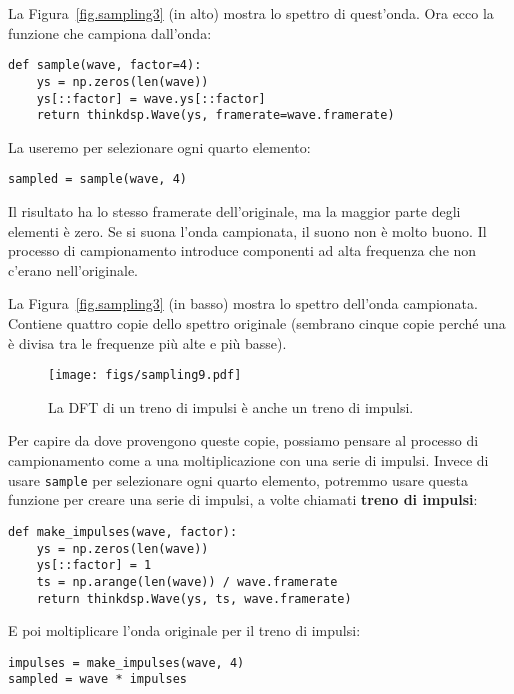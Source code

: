 \documentclass[12pt,a4paper]{book}
\begin{document}
La Figura~\ref{fig.sampling3} (in alto) mostra lo spettro di quest'onda. Ora ecco la funzione che campiona dall'onda:

\begin{verbatim} 
def sample(wave, factor=4):
    ys = np.zeros(len(wave))
    ys[::factor] = wave.ys[::factor]
    return thinkdsp.Wave(ys, framerate=wave.framerate)
 \end{verbatim} 

La useremo per selezionare ogni quarto elemento:

\begin{verbatim} 
sampled = sample(wave, 4)
 \end{verbatim} 

Il risultato ha lo stesso framerate dell'originale, ma la maggior parte degli elementi è zero. Se si suona l'onda campionata, il suono non è molto buono. Il processo di campionamento introduce componenti ad alta frequenza che non c'erano nell'originale.

La Figura~\ref{fig.sampling3} (in basso) mostra lo spettro dell'onda campionata. Contiene quattro copie dello spettro originale (sembrano cinque copie perché una è divisa tra le frequenze più alte e più basse).

\begin{figure} 

\centerline{\texttt{[image: figs/sampling9.pdf]}} \caption{La DFT di un treno di impulsi è anche un treno di impulsi.} \label{fig.sampling9} \end{figure} 

Per capire da dove provengono queste copie, possiamo pensare al processo di campionamento come a una moltiplicazione con una serie di impulsi. Invece di usare {\tt sample} per selezionare ogni quarto elemento, potremmo usare questa funzione per creare una serie di impulsi, a volte chiamati {\bf treno di impulsi}:

\begin{verbatim} 
def make_impulses(wave, factor):
    ys = np.zeros(len(wave))
    ys[::factor] = 1
    ts = np.arange(len(wave)) / wave.framerate
    return thinkdsp.Wave(ys, ts, wave.framerate)
 \end{verbatim} 

E poi moltiplicare l'onda originale per il treno di impulsi:

\begin{verbatim} 
impulses = make_impulses(wave, 4)
sampled = wave * impulses
 \end{verbatim} 
\end{document}
